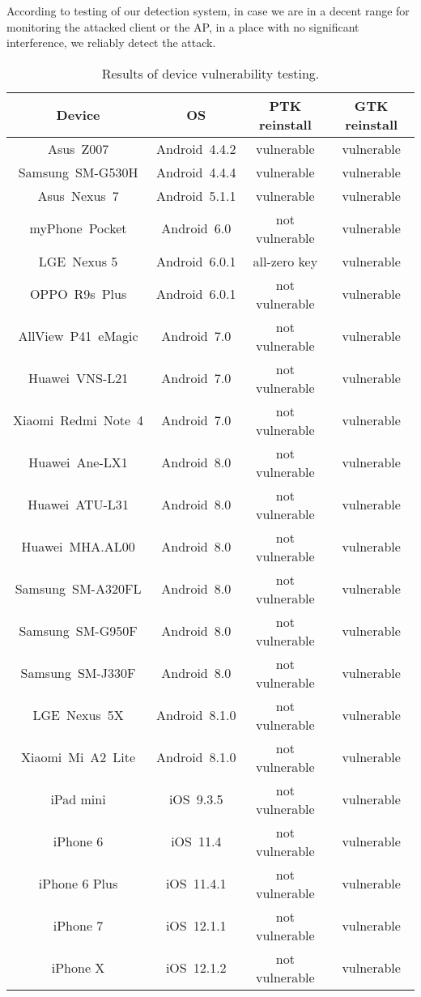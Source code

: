 According to testing of our detection system, in case we are in a decent range for monitoring the attacked client or the AP, in a place with no significant interference, we reliably detect the attack.

\begin{center}
\begin{table}[h!]
\begin{tabular}{|c|c|c|c|}
\hline
\textbf{Device} & \textbf{OS} & \textbf{PTK reinstall} & \textbf{GTK reinstall}  \\ \hline \hline
Asus~Z007 & Android~4.4.2 & vulnerable &  vulnerable \\ \hline
Samsung~SM-G530H & Android~4.4.4 & vulnerable & vulnerable \\ \hline
Asus~Nexus~7 & Android~5.1.1 & vulnerable & vulnerable \\ \hline
myPhone~Pocket  & Android~6.0 & not vulnerable & vulnerable \\ \hline
LGE~Nexus 5 & Android~6.0.1 & all-zero key & vulnerable \\ \hline
OPPO~R9s~Plus & Android~6.0.1 & not vulnerable & vulnerable \\ \hline
AllView~P41~eMagic  & Android~7.0 & not vulnerable & vulnerable  \\ \hline
Huawei~VNS-L21 & Android~7.0 & not vulnerable & vulnerable \\ \hline
Xiaomi~Redmi~Note~4 & Android~7.0 & not vulnerable & vulnerable \\ \hline
Huawei~Ane-LX1 & Android~8.0 & not vulnerable & vulnerable \\ \hline
Huawei~ATU-L31 & Android~8.0 & not vulnerable & vulnerable \\ \hline
Huawei~MHA.AL00 & Android~8.0 & not vulnerable &
 vulnerable \\ \hline
Samsung~SM-A320FL & Android~8.0 & not vulnerable & vulnerable  \\ \hline
Samsung~SM-G950F & Android~8.0 & not vulnerable & vulnerable \\ \hline
Samsung~SM-J330F  & Android~8.0 & not vulnerable & vulnerable  \\ \hline
LGE~Nexus~5X & Android~8.1.0 & not vulnerable & vulnerable \\ \hline
Xiaomi~Mi~A2~Lite & Android~8.1.0 & not vulnerable & vulnerable  \\ \hline
iPad mini & iOS~9.3.5 & not vulnerable & vulnerable \\ \hline
iPhone 6 & iOS~11.4 & not vulnerable & vulnerable  \\ \hline
iPhone 6 Plus & iOS~11.4.1 & not vulnerable & vulnerable   \\ \hline
iPhone 7 & iOS~12.1.1 & not vulnerable & vulnerable \\ \hline
iPhone X & iOS~12.1.2 & not vulnerable & vulnerable \\ \hline
\end{tabular}
\caption[Results of device vulnerability testing]{Results of device vulnerability testing.}
\label{fig:tableTests}
\end{table}
\end{center}